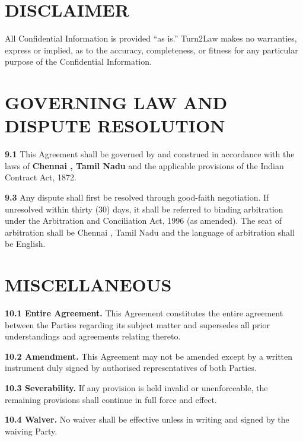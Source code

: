 \documentclass[10pt]{article}
\begin{document}
\section{DISCLAIMER}

All Confidential Information is provided ``as is.'' Turn2Law makes no warranties, express or implied, as to the accuracy, completeness, or fitness for any particular purpose of the Confidential Information.

\section{GOVERNING LAW AND DISPUTE RESOLUTION}

\textbf{9.1} This Agreement shall be governed by and construed in accordance with the laws of \textbf{Chennai , Tamil Nadu} and the applicable provisions of the Indian Contract Act, 1872.


\textbf{9.3} Any dispute shall first be resolved through good-faith negotiation. If unresolved within thirty (30) days, it shall be referred to binding arbitration under the Arbitration and Conciliation Act, 1996 (as amended). The seat of arbitration shall be Chennai , Tamil Nadu and the language of arbitration shall be English.

\section{MISCELLANEOUS}

\textbf{10.1 Entire Agreement.} This Agreement constitutes the entire agreement between the Parties regarding its subject matter and supersedes all prior understandings and agreements relating thereto.

\textbf{10.2 Amendment.} This Agreement may not be amended except by a written instrument duly signed by authorised representatives of both Parties.

\textbf{10.3 Severability.} If any provision is held invalid or unenforceable, the remaining provisions shall continue in full force and effect.

\textbf{10.4 Waiver.} No waiver shall be effective unless in writing and signed by the waiving Party.
\end{document}
